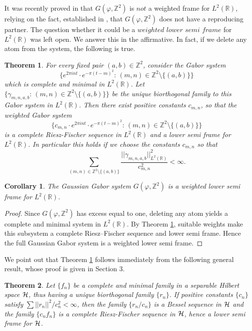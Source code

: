 \documentclass[11pt, a4paper]{article}
\newtheorem{theorem}{Theorem}[section]
\newtheorem{corollary}{Corollary}[section]
\begin{document}
It was recently proved in \cite[Section 6]{Balazs2026JFAA} that $G(\varphi, \mathbb{Z}^2)$ is $not$ a weighted
frame for $L^2 (\mathbb{R})$, relying on the fact, established in \cite[Corollaries 2.6 and 4.3]{Heil2025JFAA},\emph{} 
that $G(\varphi, \mathbb{Z}^2)$ does not have a reproducing partner.
The question whether it could be a $weighted\,\, lower\,\, semi\,\, frame$
for $L^2 (\mathbb{R})$ was left open. We answer this in the affirmative.
In fact, if we delete any atom from the system, the following is true.

\begin{theorem}\label{weightedlower}
For every fixed pair $(a,b)\in\mathbb{Z}^2$, consider the Gabor system
\[
\{e^{2\pi int}\cdot e^{-\pi(t-m)^2}:\, (m,n)\in \mathbb{Z}^2\setminus\{(a,b)\}\}
\]
which is complete and minimal in $L^2 (\mathbb{R})$. Let $\{\gamma_{m,n,a,b}:\, (m,n)\in \mathbb{Z}^2\setminus\{(a,b)\}\}$ be the unique biorthogonal family to this Gabor system in $L^2(\mathbb{R})$. Then
there exist positive constants $c_{m,n}$, so that the weighted Gabor system
\[
\{c_{m,n}\cdot  e^{2\pi int}\cdot e^{-\pi(t-m)^2}:\, (m,n)\in \mathbb{Z}^2\setminus\{(a,b)\}\}
\]
is a complete Riesz-Fischer sequence in $L^2 (\mathbb{R})$ and a lower semi frame for $L^2(\mathbb{R})$.
In particular this holds if we choose the constants $c_{m,n}$ so that
\[
\sum_{(m,n)\in \mathbb{Z}^2\setminus\{(a,b)\}}\frac{||\gamma_{m,n,a,b}||_{L^2(\mathbb{R})}^2}{c_{m,n}^2}<\infty.
\]
\end{theorem}

\begin{corollary}\label{GaborWLF}
The Gaussian Gabor system $G(\varphi, \mathbb{Z}^2)$ is a weighted lower semi frame for $L^2 (\mathbb{R})$.
\end{corollary}

\begin{proof}
Since $G(\varphi, \mathbb{Z}^2)$ has excess equal to one, deleting any atom yields a complete and minimal system in $L^2 (\mathbb{R})$.
By Theorem \ref{weightedlower}, suitable weights make this subsystem a complete Riesz–Fischer sequence and lower semi frame. Hence the full Gaussian Gabor system is a weighted lower semi frame.
\end{proof}

We point out that Theorem \ref{weightedlower} follows immediately
from the following general result, whose proof is given in Section 3. 

\begin{theorem}\label{exact}
Let $\{f_n\}$ be a complete and minimal family in a separable Hilbert space $\cal{H}$, thus having a unique biorthogonal family $\{r_n\}$.
If positive constants $\{c_n\}$ satisfy $\sum||r_n||^2/c_n^2<\infty$, then the family $\{r_n/c_n\}$ is a Bessel sequence in $\cal H$ 
and the family $\{c_n f_n\}$ is a complete Riesz-Fischer sequence in $\cal H$, hence a lower semi frame for $\cal{H}$.
\end{theorem}
\end{document}
